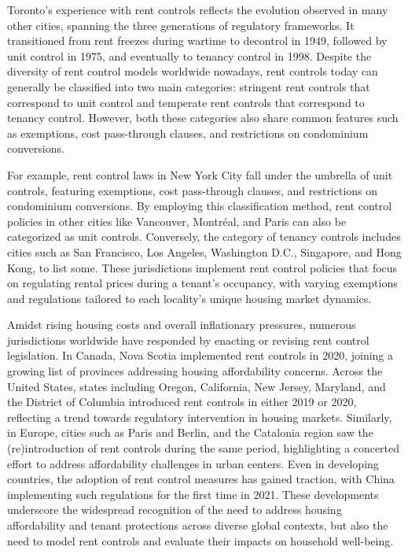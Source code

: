 \documentclass[parskip=full]{article}
\begin{document}
Toronto's experience with rent controls reflects the evolution observed in many other cities, spanning the three generations of regulatory frameworks. It transitioned from rent freezes during wartime to decontrol in 1949, followed by unit control in 1975, and eventually to tenancy control in 1998. Despite the diversity of rent control models worldwide nowadays, rent controls today can generally be classified into two main categories: stringent rent controls that correspond to unit control and temperate rent controls that correspond to tenancy control. However, both these categories also share common features such as exemptions, cost pass-through clauses, and restrictions on condominium conversions. 

For example, rent control laws in New York City fall under the umbrella of unit controls, featuring exemptions, cost pass-through clauses, and restrictions on condominium conversions. By employing this classification method, rent control policies in other cities like Vancouver, Montréal, and Paris can also be categorized as unit controls. Conversely, the category of tenancy controls includes cities such as San Francisco, Los Angeles, Washington D.C., Singapore, and Hong Kong, to list some. These jurisdictions implement rent control policies that focus on regulating rental prices during a tenant's occupancy, with varying exemptions and regulations tailored to each locality's unique housing market dynamics.

Amidst rising housing costs and overall inflationary pressures, numerous jurisdictions worldwide have responded by enacting or revising rent control legislation. In Canada, Nova Scotia implemented rent controls in 2020, joining a growing list of provinces addressing housing affordability concerns. Across the United States, states including Oregon, California, New Jersey, Maryland, and the District of Columbia introduced rent controls in either 2019 or 2020, reflecting a trend towards regulatory intervention in housing markets. Similarly, in Europe, cities such as Paris and Berlin, and the Catalonia region saw the (re)introduction of rent controls during the same period, highlighting a concerted effort to address affordability challenges in urban centers. Even in developing countries, the adoption of rent control measures has gained traction, with China implementing such regulations for the first time in 2021. These developments underscore the widespread recognition of the need to address housing affordability and tenant protections across diverse global contexts, but also the need to model rent controls and evaluate their impacts on household well-being.
\end{document}
